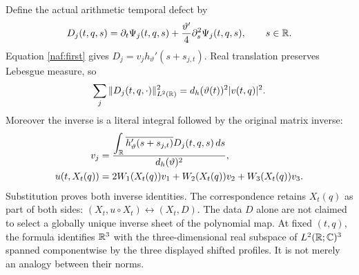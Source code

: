 Define the actual arithmetic temporal defect by
\begin{equation}
 D_j(t,q,s)=\partial_t\Psi_j(t,q,s)
                   +\frac{\vartheta'}4\partial_s^2\Psi_j(t,q,s),
 \qquad s\in\mathbb R.
 \label{naf:defect}
\end{equation}
Equation \eqref{naf:first} gives $D_j=v_j h_{\vartheta}'(s+s_{j,t})$.
Real translation preserves Lebesgue measure, so
\begin{equation}
 \sum_j\|D_j(t,q,\cdot)\|_{L^2(\mathbb R)}^2
       =d_h(\vartheta(t))^2|v(t,q)|^2.
 \label{naf:norm}
\end{equation}
Moreover the inverse is a literal integral followed by the original
matrix inverse:
\begin{equation}
 \begin{aligned}
 v_j&=\frac{\displaystyle\int_\mathbb R
      \overline{h_{\vartheta}'(s+s_{j,t})}D_j(t,q,s)\,ds}
                {d_h(\vartheta)^2},\\
 u(t,X_t(q))&=2W_1(X_t(q))v_1+W_2(X_t(q))v_2+W_3(X_t(q))v_3.
 \end{aligned}
 \label{naf:recoveru}
\end{equation}
Substitution proves both inverse identities. The correspondence retains
$X_t(q)$ as part of both sides:
$(X_t,u\circ X_t)\leftrightarrow(X_t,D)$. The data $D$ alone are not
claimed to select a globally unique inverse sheet of the polynomial map.
At fixed $(t,q)$, the formula
identifies $\mathbb R^3$ with the three-dimensional real subspace of
$L^2(\mathbb R;\mathbb C)^3$ spanned componentwise by the three displayed shifted
profiles. It is not merely an analogy between their norms.

